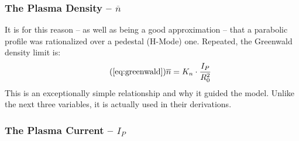 \subsubsection{The Plasma Density -- $\overline n$}

 It is for this reason -- as well as being a good approximation -- that a parabolic profile was rationalized over a pedestal (H-Mode) one. Repeated, the Greenwald density limit is:
\begin{equation}
	\tag{\ref{eq:greenwald}}
	\overline n = K_n \cdot \frac{I_P}{R_0^2}
\end{equation}
This is an exceptionally simple relationship and why it guided the model. Unlike the next three variables, it is actually used in their derivations. 

\subsubsection{The Plasma Current -- $I_P$}


